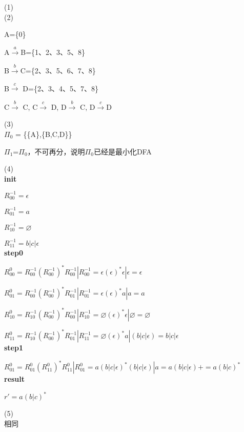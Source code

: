 \documentclass[a4paper, justified]{tufte-handout}
\begin{document}
\begin{solution}
  (1)\\

  (2)

  A=\{0\}

  A$\stackrel{a}{\longrightarrow}$B=\{1、2、3、5、8\}

  B$\stackrel{b}{\longrightarrow}$C=\{2、3、5、6、7、8\}

  B$\stackrel{c}{\longrightarrow}$ D=\{2、3、4、5、7、8\}

  C$\stackrel{b}{\longrightarrow}$ C, C$\stackrel{c}{\longrightarrow}$ D, D$\stackrel{b}{\longrightarrow}$ C, D$\stackrel{c}{\longrightarrow}$D
  
  (3)\\

  $\Pi_0$ = \{\{A\},\{B,C,D\}\}

  $\Pi_1$=$\Pi_0$，不可再分，说明$\Pi_0$已经是最小化DFA

  (4)\\

  \textbf{init}

  $R_{00}^{-1} = \epsilon $  

  $R_{01}^{-1} = a$

  $R_{10}^{-1} = \varnothing$

  $R_{11}^{-1} = b|c|\epsilon$\\

  \textbf{step0}

  $R_{00}^{0} = R_{00}^{-1}(R_{00}^{-1})^*R_{00}^{-1} | R_{00}^{-1} = \epsilon(\epsilon)^*\epsilon|\epsilon = \epsilon $

  $R_{01}^{0} = R_{00}^{-1}(R_{00}^{-1})^*R_{01}^{-1} | R_{01}^{-1} = \epsilon(\epsilon)^*a|a = a $

  $R_{10}^{0} = R_{10}^{-1}(R_{00}^{-1})^*R_{00}^{-1} | R_{10}^{-1} = \varnothing(\epsilon)^*\epsilon|\varnothing = \varnothing $

  $R_{11}^{0} = R_{10}^{-1}(R_{00}^{-1})^*R_{01}^{-1} | R_{11}^{-1} = \varnothing(\epsilon)^*a|(b|c|\epsilon) = b|c|\epsilon $\\

  \textbf{step1}

  $R_{01}^{0} = R_{01}^{0}(R_{11}^{0})^*R_{11}^{0} | R_{01}^{0} = a(b|c|\epsilon)^*(b|c|\epsilon)|a = a(b|c|\epsilon)+=a(b|c)^* $\\

  \textbf{result}

  $r' = a(b|c)^*$

  (5)\\
  
  相同


\end{solution}
\end{document}
